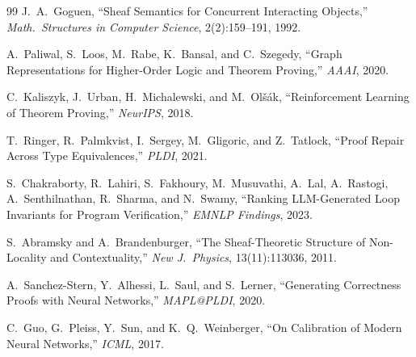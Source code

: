 \documentclass[11pt]{article}
\begin{document}
\begin{thebibliography}{99}
J.~A.~Goguen, ``Sheaf Semantics for Concurrent Interacting Objects,''
\emph{Math.\ Structures in Computer Science}, 2(2):159--191, 1992.

A.~Paliwal, S.~Loos, M.~Rabe, K.~Bansal, and C.~Szegedy,
``Graph Representations for Higher-Order Logic and Theorem Proving,''
\emph{AAAI}, 2020.

C.~Kaliszyk, J.~Urban, H.~Michalewski, and M.~Ol\v{s}\'ak,
``Reinforcement Learning of Theorem Proving,''
\emph{NeurIPS}, 2018.

T.~Ringer, R.~Palmkvist, I.~Sergey, M.~Gligoric, and Z.~Tatlock,
``Proof Repair Across Type Equivalences,''
\emph{PLDI}, 2021.

S.~Chakraborty, R.~Lahiri, S.~Fakhoury, M.~Musuvathi, A.~Lal,
A.~Rastogi, A.~Senthilnathan, R.~Sharma, and N.~Swamy,
``Ranking LLM-Generated Loop Invariants for Program Verification,''
\emph{EMNLP Findings}, 2023.

S.~Abramsky and A.~Brandenburger,
``The Sheaf-Theoretic Structure of Non-Locality and Contextuality,''
\emph{New J.~Physics}, 13(11):113036, 2011.

A.~Sanchez-Stern, Y.~Alhessi, L.~Saul, and S.~Lerner,
``Generating Correctness Proofs with Neural Networks,''
\emph{MAPL@PLDI}, 2020.

C.~Guo, G.~Pleiss, Y.~Sun, and K.~Q.~Weinberger,
``On Calibration of Modern Neural Networks,''
\emph{ICML}, 2017.

\end{thebibliography}
\end{document}
